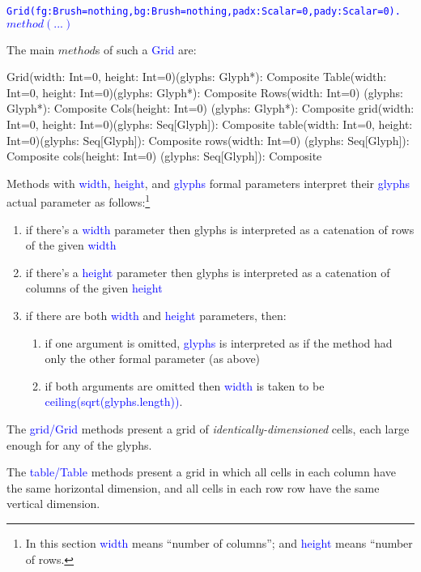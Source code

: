 \documentclass[12pt,a4paper]{article}
\def\Scala#1{\textcolor{blue}{\textsf{#1}}}
\begin{document}
\begin{alltt}\textcolor{blue}{Grid(fg: Brush=nothing, bg: Brush=nothing, padx: Scalar=0, pady: Scalar=0).\(method(...)\)}
\end{alltt}

The main $method$s of such a \Scala{Grid} are:
\begin{scala}
  Grid(width:  Int=0, height: Int=0)(glyphs: Glyph*):      Composite
  Table(width: Int=0, height: Int=0)(glyphs: Glyph*):      Composite
  Rows(width:  Int=0)                (glyphs: Glyph*):     Composite 
  Cols(height: Int=0)                (glyphs: Glyph*):     Composite 
  grid(width:  Int=0, height: Int=0)(glyphs: Seq[Glyph]):  Composite
  table(width: Int=0, height: Int=0)(glyphs: Seq[Glyph]):  Composite
  rows(width:  Int=0)                (glyphs: Seq[Glyph]): Composite
  cols(height: Int=0)                (glyphs: Seq[Glyph]): Composite
\end{scala}

Methods with \Scala{width}, \Scala{height}, and \Scala{glyphs} formal parameters interpret
their \Scala{glyphs} actual parameter as follows:\footnote{In this section \Scala{width} means ``number of columns''; and \Scala{height} means
``number of rows.}
\begin{enumerate}
     \item  if there's a \Scala{width} parameter then glyphs is interpreted as a catenation of rows of the given \Scala{width}
     \item if there's a \Scala{height} parameter then glyphs is interpreted as a catenation of columns of the given \Scala{height}
     \item if there are both \Scala{width} and \Scala{height} parameters, then:
    \begin{enumerate}
         \item if one argument is omitted,
         \Scala{glyphs} is interpreted as if the method had only the other formal parameter (as above)
         \item if  both arguments are omitted then \Scala{width} is taken to be \Scala{ceiling(sqrt(glyphs.length))}.
    \end{enumerate}
\end{enumerate}


The \Scala{grid/Grid} methods present a grid of
\textit{identically-dimensioned} cells,
each large enough for any of the glyphs.

The \Scala{table/Table} methods present a grid in which 
all cells in each column have the same horizontal dimension, and all cells in each row
row have the same vertical dimension.
\end{document}
